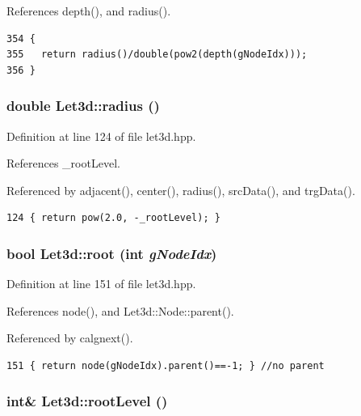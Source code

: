 References depth(), and radius().

\footnotesize\begin{verbatim}354 {
355   return radius()/double(pow2(depth(gNodeIdx)));
356 }
\end{verbatim}\normalsize 


\subsubsection{\setlength{\rightskip}{0pt plus 5cm}double Let3d::radius ()\hspace{0.3cm}{\tt  [inline]}}\label{classLet3d_703550342372334b492a37f2f4379409_703550342372334b492a37f2f4379409}




Definition at line 124 of file let3d.hpp.

References \_\-root\-Level.

Referenced by adjacent(), center(), radius(), src\-Data(), and trg\-Data().

\footnotesize\begin{verbatim}124 { return pow(2.0, -_rootLevel); }
\end{verbatim}\normalsize 


\subsubsection{\setlength{\rightskip}{0pt plus 5cm}bool Let3d::root (int {\em g\-Node\-Idx})\hspace{0.3cm}{\tt  [inline]}}\label{classLet3d_06ef4c5a5a60303ba9b0b041a8bb5000_06ef4c5a5a60303ba9b0b041a8bb5000}




Definition at line 151 of file let3d.hpp.

References node(), and Let3d::Node::parent().

Referenced by calgnext().

\footnotesize\begin{verbatim}151 { return node(gNodeIdx).parent()==-1; } //no parent
\end{verbatim}\normalsize 


\subsubsection{\setlength{\rightskip}{0pt plus 5cm}int\& Let3d::root\-Level ()\hspace{0.3cm}{\tt  [inline]}}\label{classLet3d_f80fcb36cb42936f1912fe8c85ec96e4_f80fcb36cb42936f1912fe8c85ec96e4}




